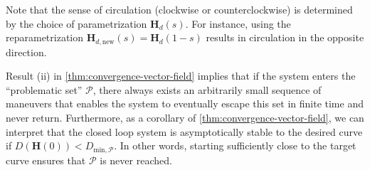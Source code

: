 Note that the sense of circulation (clockwise or counterclockwise) is determined by the choice of parametrization $\mathbf{H}_d(s)$. For instance, using the reparametrization $\mathbf{H}_{d,\text{new}}(s) = \mathbf{H}_d(1-s)$ results in circulation in the opposite direction.

Result (ii) in \cref{thm:convergence-vector-field} implies that if the system enters the ``problematic set'' $\mathcal{P}$, there always exists an arbitrarily small sequence of maneuvers that enables the system to eventually escape this set in finite time and never return. Furthermore, as a corollary of \cref{thm:convergence-vector-field}, we can interpret that the closed loop system is asymptotically stable to the desired curve if $D(\mathbf{H}(0)) < D_{\text{min}, \mathcal{P}}$. In other words, starting sufficiently close to the target curve ensures that $\mathcal{P}$ is never reached.
